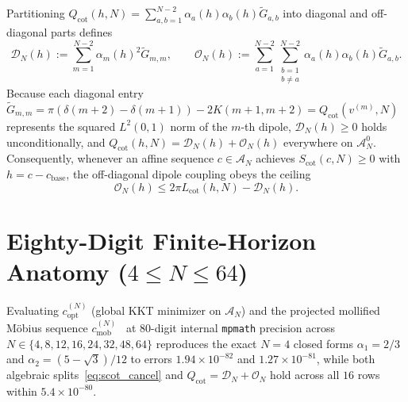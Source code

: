 \documentclass[10pt,a4paper]{article}
\theoremstyle{definition}
\begin{document}
Partitioning $Q_{\mathrm{cot}}(h,N) = \sum_{a,b=1}^{N-2}\alpha_a(h)\alpha_b(h) \widetilde{G}_{a,b}$ into diagonal and off-diagonal parts defines
\[
\mathcal{D}_N(h) := \sum_{m=1}^{N-2} \alpha_m(h)^2 \widetilde{G}_{m,m}, \qquad
\mathcal{O}_N(h) := \sum_{a=1}^{N-2}\sum_{\substack{b=1 \\ b \ne a}}^{N-2} \alpha_a(h)\alpha_b(h) \widetilde{G}_{a,b}.
\]
Because each diagonal entry $\widetilde{G}_{m,m} = \pi(\delta(m+2)-\delta(m+1)) - 2 K(m+1,m+2) = Q_{\mathrm{cot}}(v^{(m)}, N)$ represents the squared $L^2(0,1)$ norm of the $m$-th dipole, $\mathcal{D}_N(h) \ge 0$ holds unconditionally, and $Q_{\mathrm{cot}}(h,N) = \mathcal{D}_N(h) + \mathcal{O}_N(h)$ everywhere on $\mathcal{A}_N^0$. Consequently, whenever an affine sequence $c \in \mathcal{A}_N$ achieves $S_{\mathrm{cot}}(c,N) \ge 0$ with $h = c - c_{\mathrm{base}}$, the off-diagonal dipole coupling obeys the ceiling
\begin{equation}\label{eq:offdiag_frontier}
\mathcal{O}_N(h) \le 2\pi L_{\mathrm{cot}}(h, N) - \mathcal{D}_N(h).
\end{equation}

\section{Eighty-Digit Finite-Horizon Anatomy (\texorpdfstring{$4 \le N \le 64$}{4 <= N <= 64})}\label{sec:lab}

Evaluating $c_{\mathrm{opt}}^{(N)}$ (global KKT minimizer on $\mathcal{A}_N$) and the projected mollified M\"obius sequence $c_{\mathrm{mob}}^{(N)}$~\cite{BaezDuarteBalazardLandreauSaias2000} at $80$-digit internal \texttt{mpmath} precision across $N \in \{4, 8, 12, 16, 24, 32, 48, 64\}$ reproduces the exact $N=4$ closed forms $\alpha_1 = 2/3$ and $\alpha_2 = (5-\sqrt{3})/12$ to errors $1.94 \times 10^{-82}$ and $1.27 \times 10^{-81}$, while both algebraic splits~\eqref{eq:scot_cancel} and $Q_{\mathrm{cot}} = \mathcal{D}_N + \mathcal{O}_N$ hold across all $16$ rows within $5.4 \times 10^{-80}$.
\end{document}
